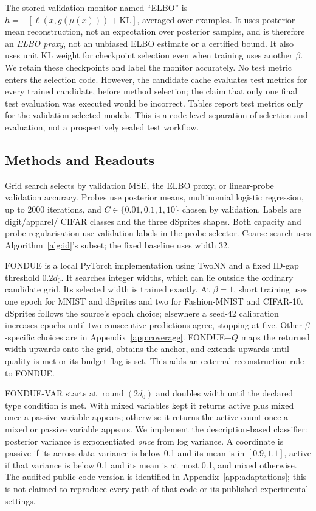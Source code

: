 \documentclass[make,article,submit,pdftex,moreauthors]{Definitions/mdpi}
\begin{document}
The stored validation monitor named ``ELBO'' is
$h=-[\ell(x,g(\mu(x)))+\mathrm{KL}]$, averaged over examples. It uses
posterior-mean reconstruction, not an expectation over posterior samples,
and is therefore an \emph{ELBO proxy}, not an unbiased ELBO estimate or a
certified bound. It also uses unit KL weight for checkpoint selection
even when training uses another $\beta$. We retain these checkpoints and
label the monitor accurately. No test metric enters the selection code.
However, the candidate cache evaluates test metrics for every trained
candidate, before method selection; the claim that only one final test
evaluation was executed would be incorrect. Tables report test metrics
only for the validation-selected models. This is a code-level separation
of selection and evaluation, not a prospectively sealed test workflow.

\subsection{Methods and Readouts}\label{sec:methods}
Grid search selects by validation MSE, the ELBO proxy, or linear-probe
validation accuracy. Probes use posterior means, multinomial logistic
regression, up to 2000 iterations, and
$C\in\{0.01,0.1,1,10\}$ chosen by validation. Labels are digit/apparel/
CIFAR classes and the three dSprites shapes. Both capacity and probe
regularisation use validation labels in the probe selector. Coarse search
uses Algorithm~\ref{alg:id}'s subset; the fixed baseline uses width 32.

FONDUE is a local PyTorch implementation using TwoNN and a fixed
ID-gap threshold $0.2d_0$. It searches integer widths, which can lie
outside the ordinary candidate grid. Its selected width is trained
exactly. At $\beta=1$, short training uses one epoch for MNIST and
dSprites and two for Fashion-MNIST and CIFAR-10. dSprites follows the
source's epoch choice; elsewhere a seed-42 calibration increases epochs
until two consecutive predictions agree, stopping at five. Other
$\beta$-specific choices are in Appendix~\ref{app:coverage}.
FONDUE+$Q$ maps the returned width upwards onto the grid, obtains the
anchor, and extends upwards until quality is met or its budget flag is
set. This adds an external reconstruction rule to FONDUE.

FONDUE-VAR starts at $\operatorname{round}(2d_0)$ and doubles width until
the declared type condition is met. With mixed variables kept it returns
active plus mixed once a passive variable appears; otherwise it returns
the active count once a mixed or passive variable appears. We implement
the description-based classifier: posterior variance is exponentiated
\emph{once} from log variance. A coordinate is passive if its across-data
variance is below 0.1 and its mean is in $[0.9,1.1]$, active if that
variance is below 0.1 and its mean is at most 0.1, and mixed otherwise.
The audited public-code version is identified in
Appendix~\ref{app:adaptations}; this is not claimed to reproduce every
path of that code or its published experimental settings.
\end{document}
